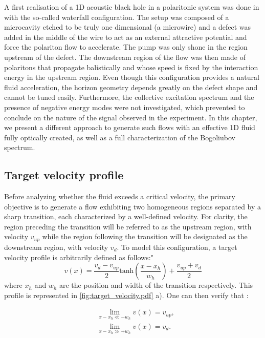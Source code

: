 A first realisation of a 1D acoustic black hole in a polaritonic system was done in \cite{nguyen_acoustic_2015} with the so-called waterfall configuration. 
The setup was composed of a microcavity etched to be truly one dimensional (a microwire) and a defect was added in the middle of the wire to act as an external attractive potential and force the polariton flow to accelerate. The pump was only shone in the region upstream of the defect. The downstream region of the flow was then made of polaritons that propagate balistically and whose speed is fixed by the interaction energy
in the upstream region.
Even though this configuration provides a natural fluid acceleration, the horizon geometry depends greatly on the defect shape and cannot be tuned easily.  Furthermore, the collective excitation spectrum and the presence of negative energy modes were not investigated, which 
prevented to conclude on the nature of the signal observed in the experiment. In this chapter, we present a different approach to generate such flows with an effective 1D fluid fully optically created, as well as a full characterization of the Bogoliubov spectrum.

\subsection{Target velocity profile}
Before analyzing whether the fluid exceeds a critical velocity, the primary objective is to generate a flow exhibiting two homogeneous regions separated by a sharp transition, each characterized by a well-defined velocity. For clarity, the region preceding the transition will be referred to as the upstream region, with velocity $v_{up}$ while the region following the transition will be designated as the downstream region, with velocity $v_{d}$.
To model this configuration, a target velocity profile is arbitrarily defined as follows:"
\begin{equation}
    v(x)= \frac{v_{d}-v_{up}}{2}\mathrm{tanh}(\frac{x-x_h}{w_h})+\frac{v_{up}+v_{d}}{2}
    \label{eq:target_velocity}
\end{equation}
where $x_h$ and $w_h$ are the position and width of the transition respectively. This profile is represented in \autoref{fig:target_velocity.pdf} a).
One can then verify that :

\begin{subequations}
    \begin{align}
    &\lim\limits_{x-x_h\ll-w_h} v(x) = v_{up},\\
    &\lim\limits_{x-x_h\gg+w_h} v(x) = v_{d}.
    \end{align}
\end{subequations}

